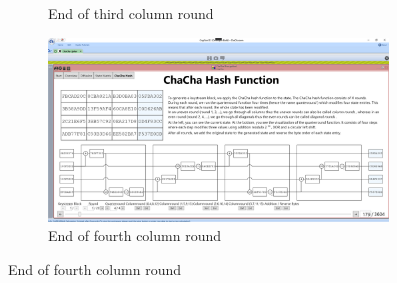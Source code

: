 \begin{figure}
\begin{subfigure}{0.5\textwidth}
  \caption{End of third column round}
  \label{fig:chachahash.cr.3}
\end{subfigure}%
\begin{subfigure}{0.5\textwidth}
  \centering
  \includegraphics[width=0.99\textwidth]{figures/ct2/chachahash/chachahash-cr4-end.png}
  \caption{End of fourth column round}
  \label{fig:chachahash.cr.4}
\end{subfigure}


\end{figure}
